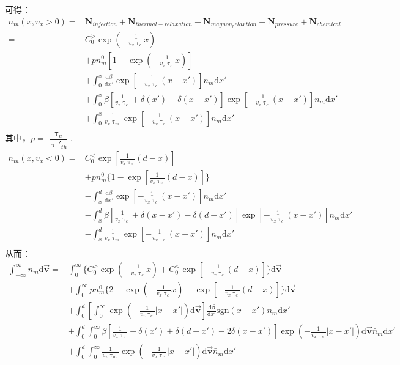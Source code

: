 \documentclass{article}
\begin{document}
	可得：
	\begin{equation}\label{eq:3}
	\begin{aligned}
		n_m(x,v_x>0)=&\textbf{N}_{injection}+\textbf{N}_{thermal-relaxation}+\textbf{N}_{magnon_relaxtion}+\textbf{N}_{pressure}+\textbf{N}_{chemical}\\
			=&C_0^>\exp(-\frac{1}{v_x\uptau_c}x)\\
			&+pn^0_m[1-\exp(-\frac{1}{v_x\uptau_c}x)]\\
			&+\int_0^x\frac{\mathrm{d}\beta}{\mathrm{d}x'}\exp[-\frac{1}{v_x\uptau_{c}}(x-x')]\bar{n}_m\mathrm{d}x'\\
			&+\int_0^x\beta[\frac{1}{v_x\uptau_c}+\delta(x')-\delta(x-x')]\exp[-\frac{1}{v_x\uptau_{c}}(x-x')]\bar{n}_m\mathrm{d}x'\\
			&+\int_0^x\frac{1}{v_x\uptau_m}\exp[-\frac{1}{v_x\uptau_{c}}(x-x')]\bar{n}_m\mathrm{d}x'\\
	\end{aligned}
	\end{equation}
	其中，$p=\dfrac{\uptau_c}{\uptau'_{th}}.$
	\begin{equation}\label{eq:4}
	\begin{aligned}
		n_m(x,v_x<0)=&C_0^<\exp[\frac{1}{v_x\uptau_c}(d-x)]\\
			&+pn^0_m\{1-\exp[\frac{1}{v_x\uptau_c}(d-x)]\}\\
			&-\int_x^d\frac{\mathrm{d}\beta}{\mathrm{d}x'}\exp[-\frac{1}{v_x\uptau_{c}}(x-x')]\bar{n}_m\mathrm{d}x'\\
			&-\int_x^d\beta[\frac{1}{v_x\uptau_c}+\delta(x-x')-\delta(d-x')]\exp[-\frac{1}{v_x\uptau_{c}}(x-x')]\bar{n}_m\mathrm{d}x'\\
			&-\int_x^d\frac{1}{v_x\uptau_m}\exp[-\frac{1}{v_x\uptau_{c}}(x-x')]\bar{n}_m\mathrm{d}x'\\
	\end{aligned}
	\end{equation}
	从而：
	\begin{equation}\label{eq:5}
		\begin{aligned}
			\int_{-\infty}^{\infty}n_m\mathrm{d}\vec{\textbf{v}}=&\int_0^\infty \{C_0^>\exp(-\frac{1}{v_x\uptau_c}x)+C_0^<\exp[-\frac{1}{v_x\uptau_c}(d-x)]\}\mathrm{d}\vec{\textbf{v}}\\
			&+\int_0^\infty pn^0_m\{2-\exp(-\frac{1}{v_x\uptau_c}x)-\exp[-\frac{1}{v_x\uptau_c}(d-x)]\}\mathrm{d}\vec{\textbf{v}}\\
			&+\int_0^d[\int_0^\infty\exp(-\frac{1}{v_x\uptau_{c}}|x-x'|)\mathrm{d}\vec{\textbf{v}}]\frac{\mathrm{d}\beta}{\mathrm{d}x'}\mathrm{sgn}(x-x')\bar{n}_m\mathrm{d}x'\\
			&+\int_0^d\int_0^\infty\beta[\frac{1}{v_x\uptau_c}+\delta(x')+\delta(d-x')-2\delta(x-x')]\exp(-\frac{1}{v_x\uptau_{c}}|x-x'|)\mathrm{d}\vec{\textbf{v}}\bar{n}_m\mathrm{d}x'\\
			&+\int_0^d\int_0^\infty\frac{1}{v_x\uptau_m}\exp(-\frac{1}{v_x\uptau_{c}}|x-x'|)\mathrm{d}\vec{\textbf{v}}\bar{n}_m\mathrm{d}x'\\
		\end{aligned}
	\end{equation}
\end{document}
